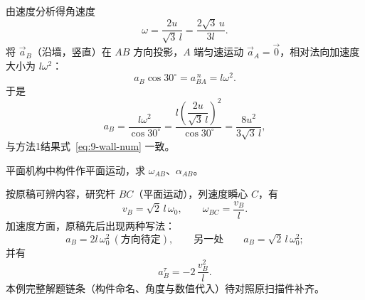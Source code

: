 \begin{longexample}[例1 求B点的速度和加速度]
由速度分析得角速度
\begin{equation}\label{eq:9-wall-m2-w}
  \omega=\frac{2u}{\sqrt{3}\,l}=\frac{2\sqrt{3}\,u}{3l}.
\end{equation}
将 $\vec{a}_B$（沿墙，竖直）在 $AB$ 方向投影，$A$ 端匀速运动 $\vec{a}_A=\vec{0}$，相对法向加速度大小为 $l\omega^{2}$：
\begin{equation}\label{eq:9-wall-m2-proj}
  a_B\cos 30^\circ = a_{BA}^{\,n} = l\omega^{2}.
\end{equation}
于是
\begin{equation}\label{eq:9-wall-m2-ab}
  a_B=\frac{l\omega^{2}}{\cos 30^\circ}
     =\frac{l\left(\dfrac{2u}{\sqrt{3}\,l}\right)^{2}}{\cos 30^\circ}
     =\frac{8u^{2}}{3\sqrt{3}\,l},
\end{equation}
与方法1结果式~\eqref{eq:9-wall-num} 一致。
\end{longexample}

\begin{longexample}[例2 求 $\omega_{AB}$、$\alpha_{AB}$]
平面机构中构件作平面运动，求 $\omega_{AB}$、$\alpha_{AB}$。

\begin{solution}
按原稿可辨内容，研究杆 $BC$（平面运动），列速度瞬心 $C$，有
\begin{equation}\label{eq:9-synth2-v}
  v_B=\sqrt{2}\,l\,\omega_0,
  \qquad
  \omega_{BC}=\frac{v_B}{l}.
\end{equation}
加速度方面，原稿先后出现两种写法：
\begin{equation}\label{eq:9-synth2-a}
  a_B=2l\,\omega_0^{2}\ (\text{方向待定}),
  \qquad\text{另一处}\qquad
  a_B=\sqrt{2}\,l\,\omega_0^{2};
\end{equation}
并有
\begin{equation}\label{eq:9-synth2-at}
  a_B^{\tau}=-2\,\frac{v_B^{2}}{l}.
\end{equation}
本例完整解题链条（构件命名、角度与数值代入）待对照原扫描件补齐。
\end{solution}
\end{longexample}

